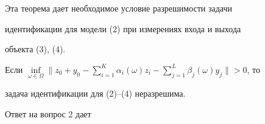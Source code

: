 Эта теорема дает необходимое условие разрешимости задачи


идентификации для модели (2) при измерениях входа и выхода


объекта (3), (4).








\begin{cornonum}


Если $\inf\limits_{\omega\in\Omega}


\Big\|z_0+y_0-\sum\limits^K_{i=1}\alpha_i(\omega)z_i-


\sum\limits^L_{j=1}\beta_j(\omega)y_j\Big\|>0$, то


задача идентификации для (2)--(4) неразрешима.


\end{cornonum}





Ответ на вопрос 2 дает





